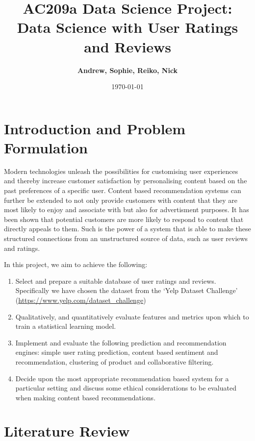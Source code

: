 \documentclass[11pt]{article}
\title{
\vspace{1cm}
\textmd{\textbf{AC209a Data Science Project: Data Science with User Ratings and Reviews}}\\
}
\author{\textbf{Andrew, Sophie, Reiko, Nick}}
\date{\today} %
\begin{document}
\maketitle

\section*{Introduction and Problem Formulation}
	Modern technologies unleash the possibilities for customising user experiences and thereby increase customer satisfaction by personalising content \cite{beginners_guide}
	based on the past preferences of a specific user. Content based recommendation systems can further be extended to not only provide customers with content that they are most likely to enjoy and associate with but also for advertisment purposes. It has been shown \cite{netflix} that potential customers are more likely to respond to content that directly appeals to them. Such is the power of a system that is able to make these structured connections from an unstructured source of data, such as user reviews and ratings.

	In this project, we aim to achieve the following:
	\begin{enumerate}
		\item Select and prepare a suitable database of user ratings and reviews. Specifically we have chosen the dataset from the `Yelp Dataset Challenge' (\url{https://www.yelp.com/dataset_challenge})
		\item Qualitatively, and quantitatively evaluate features and metrics upon which to train a statistical learning model.
		\item Implement and evaluate the following prediction and recommendation engines: simple user rating prediction, content based sentiment and recommendation, clustering of product and collaborative filtering.
		\item Decide upon the most appropriate recommendation based system for a particular setting and discuss some ethical considerations to be evaluated when making content based recommendations.
	\end{enumerate}



\newpage
\section*{Literature Review}
\end{document}
